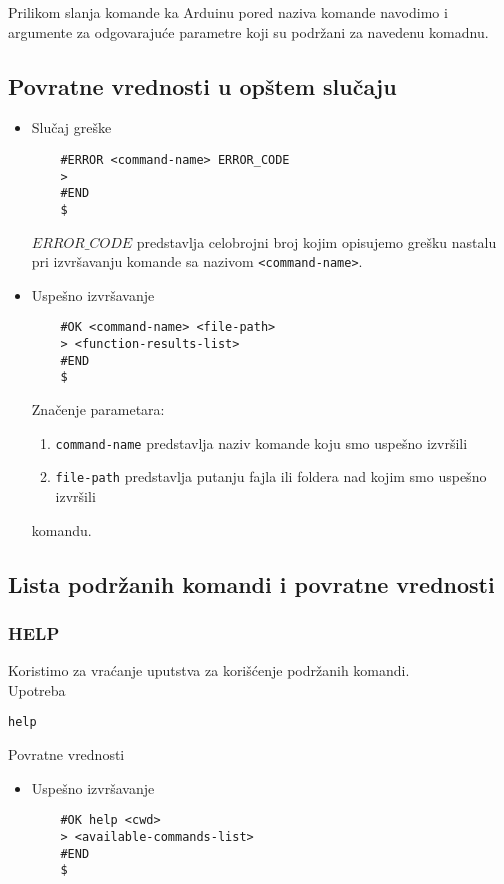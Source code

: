 \documentclass[a4paper]{extarticle}
\begin{document}
Prilikom slanja komande ka Arduinu  pored naziva komande navodimo i argumente za odgovarajuće parametre koji su podržani za navedenu komadnu.



\subsection{Povratne vrednosti u opštem slučaju}
	
	\label{povratnevrednosti}
\begin{itemize}
	\item Slučaj greške\\
	\begin{verbatim}
	#ERROR <command-name> ERROR_CODE
	>
	#END
	$
	\end{verbatim}
	$ERROR\_CODE$ predstavlja celobrojni broj kojim opisujemo grešku nastalu pri izvršavanju  komande sa nazivom \verb|<command-name>|.\\
	\item Uspešno izvršavanje\\
	\begin{verbatim}
	#OK <command-name> <file-path>
	> <function-results-list>
	#END
	$
	\end{verbatim}
	Značenje parametara:
	\begin{enumerate}
		\item \verb|command-name| predstavlja naziv komande koju smo uspešno izvršili
		\item \verb|file-path| predstavlja putanju fajla ili foldera nad kojim smo uspešno izvršili
	\end{enumerate}
	 
	komandu.
	
\end{itemize}

\subsection{Lista podržanih komandi i povratne vrednosti}
\subsubsection{HELP}
Koristimo za vraćanje uputstva za korišćenje podržanih komandi.\\
Upotreba
\begin{verbatim}
help
\end{verbatim}
Povratne vrednosti
\begin{itemize}
	\item Uspešno izvršavanje\\
	\begin{verbatim}
	#OK help <cwd>
	> <available-commands-list>
	#END
	$
	\end{verbatim}
\end{itemize}
\end{document}
